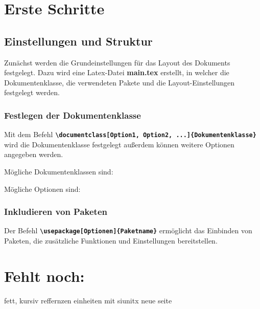 \section{Erste Schritte}
\subsection{Einstellungen und Struktur}

Zunächst werden die Grundeinstellungen für das Layout des Dokuments festgelegt. Dazu wird eine Latex-Datei \textbf{main.tex} erstellt, in welcher die Dokumentenklasse, die verwendeten Pakete und die Layout-Einstellungen festgelegt werden.

\subsubsection{Festlegen der Dokumentenklasse}
Mit dem Befehl \textbf{\texttt{\textbackslash documentclass[Option1, Option2, ...]\{Dokumentenklasse\}}} wird die Dokumentenklasse festgelegt außerdem können weitere Optionen angegeben werden.

Mögliche Dokumentenklassen sind:


Mögliche Optionen sind:



\subsubsection{Inkludieren von Paketen}
Der Befehl \textbf{\texttt{\textbackslash usepackage[Optionen]\{Paketname\}}} ermöglicht das Einbinden von Paketen, die zusätzliche Funktionen und Einstellungen bereitstellen.


\newpage

\section{Fehlt noch:}


fett, kursiv
reffernzen
%
einheiten mit siunitx
neue seite

